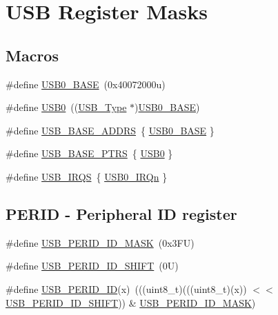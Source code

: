 \hypertarget{group___u_s_b___register___masks}{}\section{U\+SB Register Masks}
\label{group___u_s_b___register___masks}
\subsection*{Macros}
\begin{DoxyCompactItemize}
\item 
\#define \mbox{\hyperlink{group___u_s_b___register___masks_gaa47acf4992407a85e79d911ca1055d17}{U\+S\+B0\+\_\+\+B\+A\+SE}}~(0x40072000u)
\item 
\#define \mbox{\hyperlink{group___u_s_b___register___masks_gaea56c015ce8ad0cc88464060fde6d87c}{U\+S\+B0}}~((\mbox{\hyperlink{struct_u_s_b___type}{U\+S\+B\+\_\+\+Type}} $\ast$)\mbox{\hyperlink{group___u_s_b___register___masks_gaa47acf4992407a85e79d911ca1055d17}{U\+S\+B0\+\_\+\+B\+A\+SE}})
\item 
\#define \mbox{\hyperlink{group___u_s_b___register___masks_gac3fe38a7a5a01a7da6dfcc4a06f4f721}{U\+S\+B\+\_\+\+B\+A\+S\+E\+\_\+\+A\+D\+D\+RS}}~\{ \mbox{\hyperlink{group___u_s_b___register___masks_gaa47acf4992407a85e79d911ca1055d17}{U\+S\+B0\+\_\+\+B\+A\+SE}} \}
\item 
\#define \mbox{\hyperlink{group___u_s_b___register___masks_gabb481a231c7c57907377d7ee985f826c}{U\+S\+B\+\_\+\+B\+A\+S\+E\+\_\+\+P\+T\+RS}}~\{ \mbox{\hyperlink{group___u_s_b___register___masks_gaea56c015ce8ad0cc88464060fde6d87c}{U\+S\+B0}} \}
\item 
\#define \mbox{\hyperlink{group___u_s_b___register___masks_ga17e92a5c4b8217467adbbc5ab517c72f}{U\+S\+B\+\_\+\+I\+R\+QS}}~\{ \mbox{\hyperlink{group___interrupt__vector__numbers_gga666eb0caeb12ec0e281415592ae89083ad85ea858fda8e15398b5aa74c019cb7a}{U\+S\+B0\+\_\+\+I\+R\+Qn}} \}
\end{DoxyCompactItemize}
\subsection*{P\+E\+R\+ID -\/ Peripheral ID register}
\begin{DoxyCompactItemize}
\item 
\#define \mbox{\hyperlink{group___u_s_b___register___masks_ga7c4ef4c7ba738b9ec7ee90c6c482c1e5}{U\+S\+B\+\_\+\+P\+E\+R\+I\+D\+\_\+\+I\+D\+\_\+\+M\+A\+SK}}~(0x3\+F\+U)
\item 
\#define \mbox{\hyperlink{group___u_s_b___register___masks_ga15b2af97cadcb108b2489e2d29e8957e}{U\+S\+B\+\_\+\+P\+E\+R\+I\+D\+\_\+\+I\+D\+\_\+\+S\+H\+I\+FT}}~(0\+U)
\item 
\#define \mbox{\hyperlink{group___u_s_b___register___masks_gad306299b648ed1827f0b4a6ad1c81c1d}{U\+S\+B\+\_\+\+P\+E\+R\+I\+D\+\_\+\+ID}}(x)~(((uint8\+\_\+t)(((uint8\+\_\+t)(x)) $<$$<$ \mbox{\hyperlink{group___u_s_b___register___masks_ga15b2af97cadcb108b2489e2d29e8957e}{U\+S\+B\+\_\+\+P\+E\+R\+I\+D\+\_\+\+I\+D\+\_\+\+S\+H\+I\+FT}})) \& \mbox{\hyperlink{group___u_s_b___register___masks_ga7c4ef4c7ba738b9ec7ee90c6c482c1e5}{U\+S\+B\+\_\+\+P\+E\+R\+I\+D\+\_\+\+I\+D\+\_\+\+M\+A\+SK}})
\end{DoxyCompactItemize}
